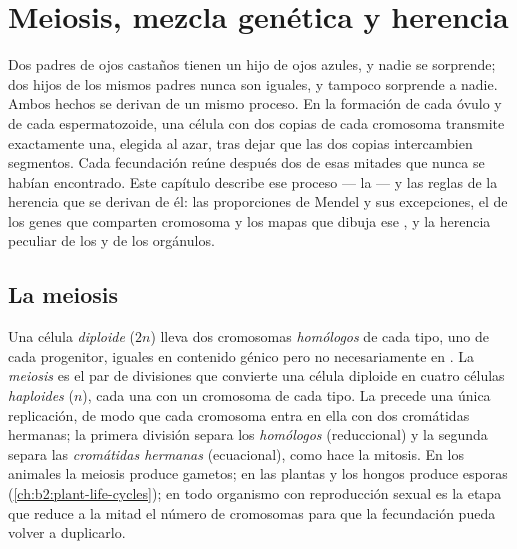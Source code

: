 \chapter{Meiosis, mezcla genética y herencia}\label{ch:b2:meiosis-heredity}

Dos padres de ojos castaños tienen un hijo de ojos azules, y nadie se
sorprende; dos hijos de los mismos padres nunca son iguales, y tampoco
sorprende a nadie. Ambos hechos se derivan de un mismo proceso. En la
formación de cada óvulo y de cada espermatozoide, una célula con dos
copias de cada cromosoma transmite exactamente una, elegida al azar,
tras dejar que las dos copias intercambien segmentos. Cada fecundación
reúne después dos de esas mitades que nunca se habían encontrado. Este
capítulo describe ese proceso --- la  --- y las reglas de la
herencia que se derivan de él: las proporciones de Mendel y sus
excepciones, el  de los genes que comparten cromosoma y los
mapas que dibuja ese , y la herencia peculiar de los
 y de los orgánulos.

\section{La meiosis}

\begin{definition}[Meiosis]\label{def:b2:meiosis-heredity:meiosis}
Una célula \emph{diploide} ($2n$) lleva dos cromosomas \emph{homólogos} de
cada tipo, uno de cada progenitor, iguales en contenido génico pero no
necesariamente en . La \emph{meiosis} es el par de divisiones que
convierte una célula diploide en cuatro células \emph{haploides} ($n$),
cada una con un cromosoma de cada tipo. La precede una única replicación,
de modo que cada cromosoma entra en ella con dos cromátidas hermanas; la
primera división separa los \emph{homólogos} (reduccional) y la segunda
separa las \emph{cromátidas hermanas} (ecuacional), como hace la mitosis.
En los animales la meiosis produce gametos; en las plantas y los hongos
produce esporas (\cref{ch:b2:plant-life-cycles}); en todo organismo con
reproducción sexual es la etapa que reduce a la mitad el número de
cromosomas para que la fecundación pueda volver a duplicarlo.
\end{definition}

